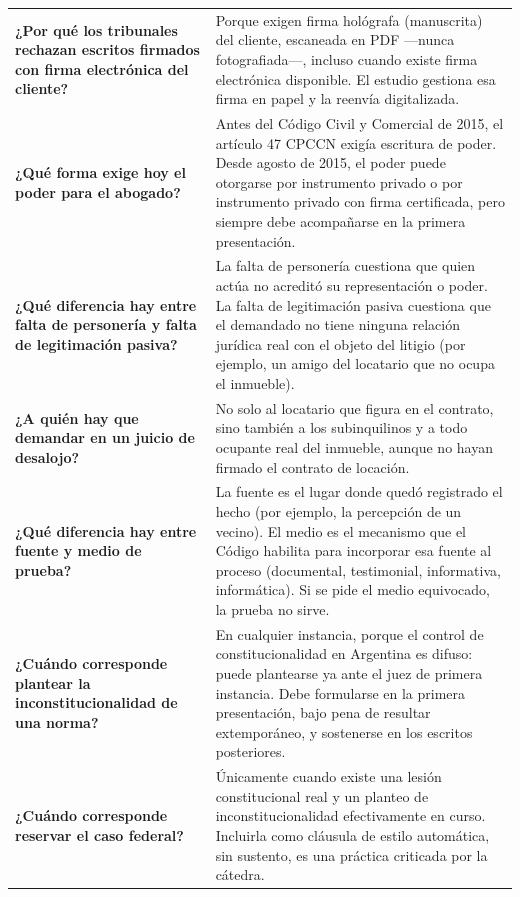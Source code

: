 \documentclass[12pt,oneside]{book}
\begin{document}
\begin{longtable}{
    >{\raggedright\arraybackslash}p{}
    >{\raggedright\arraybackslash}p{}
}
\textbf{¿Por qué los tribunales rechazan escritos firmados con firma electrónica del cliente?} &
Porque exigen firma hológrafa (manuscrita) del cliente, escaneada en PDF —nunca fotografiada—, incluso cuando existe firma electrónica disponible. El estudio gestiona esa firma en papel y la reenvía digitalizada. \\

\textbf{¿Qué forma exige hoy el poder para el abogado?} &
Antes del Código Civil y Comercial de 2015, el artículo 47 CPCCN exigía escritura de poder. Desde agosto de 2015, el poder puede otorgarse por instrumento privado o por instrumento privado con firma certificada, pero siempre debe acompañarse en la primera presentación. \\

\textbf{¿Qué diferencia hay entre falta de personería y falta de legitimación pasiva?} &
La falta de personería cuestiona que quien actúa no acreditó su representación o poder. La falta de legitimación pasiva cuestiona que el demandado no tiene ninguna relación jurídica real con el objeto del litigio (por ejemplo, un amigo del locatario que no ocupa el inmueble). \\

\textbf{¿A quién hay que demandar en un juicio de desalojo?} &
No solo al locatario que figura en el contrato, sino también a los subinquilinos y a todo ocupante real del inmueble, aunque no hayan firmado el contrato de locación. \\

\textbf{¿Qué diferencia hay entre fuente y medio de prueba?} &
La fuente es el lugar donde quedó registrado el hecho (por ejemplo, la percepción de un vecino). El medio es el mecanismo que el Código habilita para incorporar esa fuente al proceso (documental, testimonial, informativa, informática). Si se pide el medio equivocado, la prueba no sirve. \\

\textbf{¿Cuándo corresponde plantear la inconstitucionalidad de una norma?} &
En cualquier instancia, porque el control de constitucionalidad en Argentina es difuso: puede plantearse ya ante el juez de primera instancia. Debe formularse en la primera presentación, bajo pena de resultar extemporáneo, y sostenerse en los escritos posteriores. \\

\textbf{¿Cuándo corresponde reservar el caso federal?} &
Únicamente cuando existe una lesión constitucional real y un planteo de inconstitucionalidad efectivamente en curso. Incluirla como cláusula de estilo automática, sin sustento, es una práctica criticada por la cátedra. \\


\end{longtable}
\end{document}
